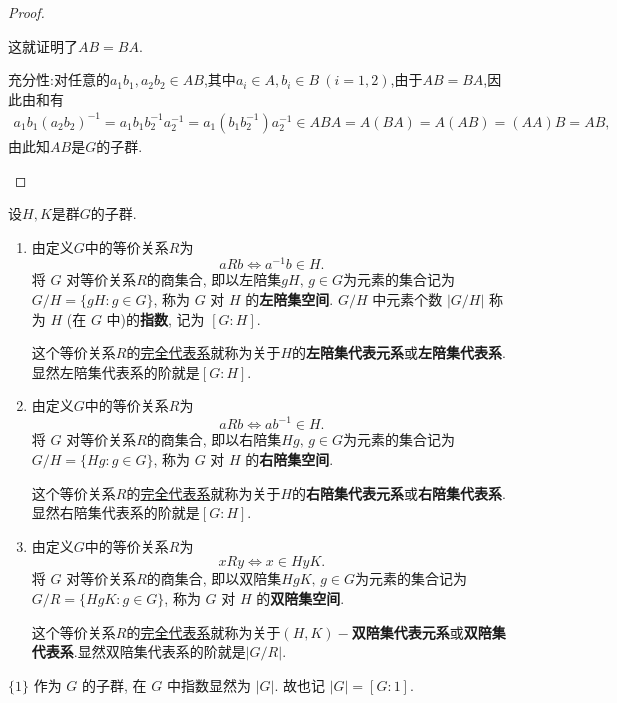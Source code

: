 \documentclass[../../main.tex]{subfiles}%
\begin{document}
\begin{proof}
\begin{enumerate}[(1)]
这就证明了$AB=BA$.

{\heiti 充分性:}对任意的$a_1b_1,a_2b_2\in AB$,其中$a_i\in A,b_i\in B\ (i=1,2)$,由于$AB=BA$,因此由和有
\begin{align*}
a_1b_1(a_2b_2)^{-1}=a_1b_1b_2^{-1}a_2^{-1}=a_1(b_1b_2^{-1})a_2^{-1}\in ABA=A(BA)=A(AB)=(AA)B=AB,
\end{align*}
由此知$AB$是$G$的子群.
\end{enumerate}

\end{proof}

\begin{definition}
设$H,K$是群$G$的子群.
\begin{enumerate}[(1)]
\item 由定义$G$中的等价关系$R$为
\[
aRb \iff a^{-1}b \in H.
\]
将 \( G \) 对等价关系$R$的商集合, 即以左陪集$gH,\,g\in G$为元素的集合记为 \( G/H=\{gH:g\in G\} \), 称为 \( G \) 对 \( H \) 的\textbf{左陪集空间}. \( G/H \) 中元素个数 \( |G/H| \) 称为 \( H \) (在 \( G \) 中)的\textbf{指数}, 记为 \( [G:H] \). 

这个等价关系$R$的\hyperref[Set-Theory-definition:等价类的完全代表系]{完全代表系}就称为关于$H$的\textbf{左陪集代表元系}或\textbf{左陪集代表系}.显然左陪集代表系的阶就是\( [G:H] \). 

\item 由定义$G$中的等价关系$R$为
\[
aRb \iff ab^{-1} \in H.
\]
将 \( G \) 对等价关系$R$的商集合, 即以右陪集$Hg,\,g\in G$为元素的集合记为 \( G/H=\{Hg:g\in G\} \), 称为 \( G \) 对 \( H \) 的\textbf{右陪集空间}. 

这个等价关系$R$的\hyperref[Set-Theory-definition:等价类的完全代表系]{完全代表系}就称为关于$H$的\textbf{右陪集代表元系}或\textbf{右陪集代表系}.显然右陪集代表系的阶就是\( [G:H] \). 

\item 由定义$G$中的等价关系$R$为
\[
xRy \iff x\in HyK.
\]
将 \( G \) 对等价关系$R$的商集合, 即以双陪集$HgK,\,g\in G$为元素的集合记为 \( G/R=\{HgK:g\in G\} \), 称为 \( G \) 对 \( H \) 的\textbf{双陪集空间}. 

这个等价关系$R$的\hyperref[Set-Theory-definition:等价类的完全代表系]{完全代表系}就称为关于$(H,K)-$\textbf{双陪集代表元系}或\textbf{双陪集代表系}.显然双陪集代表系的阶就是\( |G/R| \). 
\end{enumerate}
\end{definition}
\begin{remark}
\(\{1\}\) 作为 \( G \) 的子群, 在 \( G \) 中指数显然为 \( |G| \). 故也记 \( |G| = [G: 1] \).
\end{remark}
\end{document}
